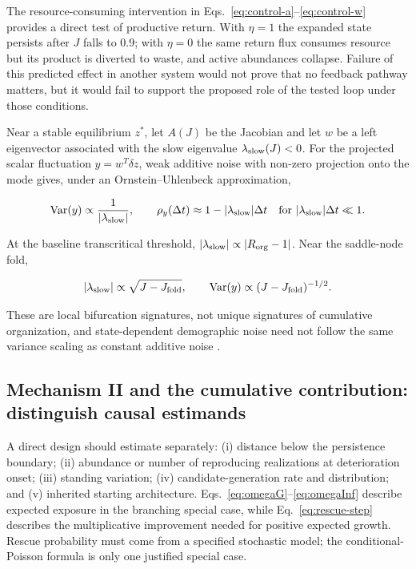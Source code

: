 \documentclass[11pt,a4paper]{article}
\begin{document}
The resource-consuming intervention in Eqs.~\eqref{eq:control-a}--\eqref{eq:control-w} provides a direct test of productive return. With $\eta=1$ the expanded state persists after $J$ falls to $0.9$; with $\eta=0$ the same return flux consumes resource but its product is diverted to waste, and active abundances collapse. Failure of this predicted effect in another system would not prove that no feedback pathway matters, but it would fail to support the proposed role of the tested loop under those conditions.

Near a stable equilibrium $z^*$, let $A(J)$ be the Jacobian and let $w$ be a left eigenvector associated with the slow eigenvalue $\lambda_{\rm slow}(J)<0$. For the projected scalar fluctuation $y=w^T\delta z$, weak additive noise with non-zero projection onto the mode gives, under an Ornstein--Uhlenbeck approximation,

\[
\operatorname{Var}(y)\propto\frac{1}{|\lambda_{\rm slow}|},
\qquad
\rho_y(\Delta t)\approx1-|\lambda_{\rm slow}|\Delta t
\quad\text{for }|\lambda_{\rm slow}|\Delta t\ll1.
\]

At the baseline transcritical threshold, $|\lambda_{\rm slow}|\propto|R_{\rm org}-1|$. Near the saddle-node fold,

\[
|\lambda_{\rm slow}|\propto\sqrt{J-J_{\rm fold}},
\qquad
\operatorname{Var}(y)\propto(J-J_{\rm fold})^{-1/2}.
\]

These are local bifurcation signatures, not unique signatures of cumulative organization, and state-dependent demographic noise need not follow the same variance scaling as constant additive noise \citep{Scheffer2009,Dakos2012}.

\subsection{Mechanism II and the cumulative contribution: distinguish causal estimands}

A direct design should estimate separately: (i) distance below the persistence boundary; (ii) abundance or number of reproducing realizations at deterioration onset; (iii) standing variation; (iv) candidate-generation rate and distribution; and (v) inherited starting architecture. Eqs.~\eqref{eq:omegaG}--\eqref{eq:omegaInf} describe expected exposure in the branching special case, while Eq.~\eqref{eq:rescue-step} describes the multiplicative improvement needed for positive expected growth. Rescue probability must come from a specified stochastic model; the conditional-Poisson formula is only one justified special case.
\end{document}

